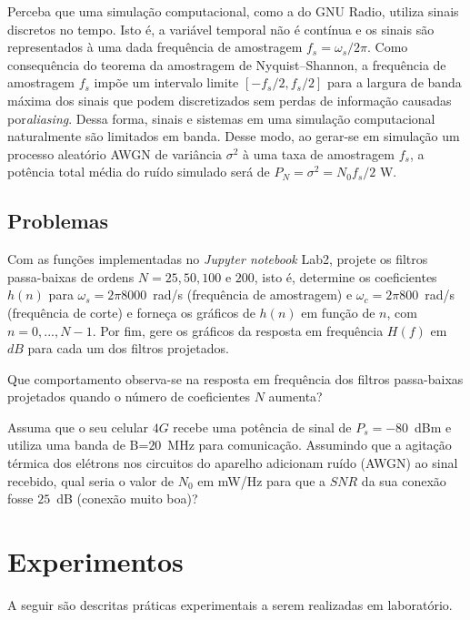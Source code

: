 \documentclass[12pt,addpoints]{exam}
\begin{document}
Perceba que uma simulação computacional, como a do GNU Radio, utiliza sinais discretos no tempo. Isto é, a variável temporal não é contínua e os sinais são representados à uma dada frequência de amostragem $f_s=\omega_s/2\pi$. Como consequência do teorema da amostragem de Nyquist–Shannon, a frequência de amostragem $f_s$ impõe um intervalo limite $[-f_s/2,f_s/2]$ para a largura de banda máxima dos sinais que podem discretizados sem perdas de informação causadas por\textit{aliasing}. Dessa forma, sinais e sistemas em uma simulação computacional naturalmente são limitados em banda. Desse modo, ao gerar-se em simulação um processo aleatório AWGN de variância $\sigma^2$ à uma taxa de amostragem $f_s$, a potência total média do ruído simulado será de $P_N = \sigma^2=N_0f_s/2$ W.

\subsection{Problemas}

\begin{questions}

\question Com as funções implementadas no \textit{Jupyter notebook} Lab2, projete os filtros passa-baixas de ordens $N = 25,50,100\text{ e }200$, isto é, determine os coeficientes $h(n)$ para $\omega_s = 2\pi 8000$~rad/s (frequência de amostragem) e $\omega_c = 2\pi 800$~rad/s (frequência de corte) e forneça os gráficos de $h(n)$ em função de $n$, com $n=0,...,N-1$. Por fim, gere os gráficos da resposta em frequência $H(f)$ em $dB$ para cada um dos filtros projetados. 

\question Que comportamento observa-se na resposta em frequência dos filtros passa-baixas projetados quando o número de coeficientes $N$ aumenta?

\question Assuma que o seu celular $4G$ recebe uma potência de sinal de $P_s=-80$~dBm e utiliza uma banda de B=$20$~MHz para comunicação. Assumindo que a agitação térmica dos elétrons nos circuitos do aparelho adicionam ruído (AWGN) ao sinal recebido, qual seria o valor de $N_0$ em mW/Hz para que a $SNR$ da sua conexão fosse $25$~dB (conexão muito boa)?

\end{questions}

\section{Experimentos}

A seguir são descritas práticas experimentais a serem realizadas em laboratório. 
\end{document}
